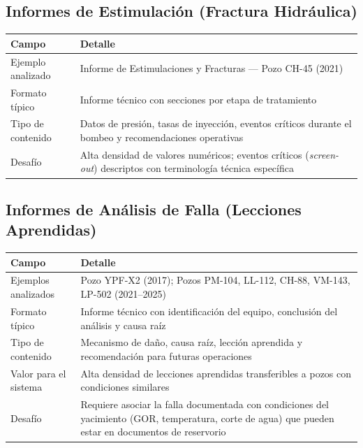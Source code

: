 \documentclass[12pt, a4paper]{article}
\begin{document}
\subsection{Informes de Estimulaci\'{o}n (Fractura Hidr\'{a}ulica)}

\begin{tabularx}{\textwidth}{BL}
  \toprule
  \textbf{Campo} & \textbf{Detalle} \\
  \midrule
  Ejemplo analizado   & Informe de Estimulaciones y Fracturas --- Pozo CH-45 (2021) \\
  \addlinespace
  Formato t\'{i}pico  & Informe t\'{e}cnico con secciones por etapa de tratamiento \\
  \addlinespace
  Tipo de contenido   & Datos de presi\'{o}n, tasas de inyecci\'{o}n, eventos cr\'{i}ticos
                        durante el bombeo y recomendaciones operativas \\
  \addlinespace
  Desaf\'{i}o         & Alta densidad de valores num\'{e}ricos; eventos cr\'{i}ticos
                        (\textit{screen-out}) descriptos con terminolog\'{i}a t\'{e}cnica
                        espec\'{i}fica \\
  \bottomrule
\end{tabularx}

\subsection{Informes de An\'{a}lisis de Falla (Lecciones Aprendidas)}

\begin{tabularx}{\textwidth}{BL}
  \toprule
  \textbf{Campo} & \textbf{Detalle} \\
  \midrule
  Ejemplos analizados & Pozo YPF-X2 (2017); Pozos PM-104, LL-112, CH-88, VM-143, LP-502
                        (2021--2025) \\
  \addlinespace
  Formato t\'{i}pico  & Informe t\'{e}cnico con identificaci\'{o}n del equipo,
                        conclusi\'{o}n del an\'{a}lisis y causa ra\'{i}z \\
  \addlinespace
  Tipo de contenido   & Mecanismo de da\~{n}o, causa ra\'{i}z, lecci\'{o}n aprendida y
                        recomendaci\'{o}n para futuras operaciones \\
  \addlinespace
  Valor para el sistema & Alta densidad de lecciones aprendidas transferibles a pozos con
                          condiciones similares \\
  \addlinespace
  Desaf\'{i}o         & Requiere asociar la falla documentada con condiciones del yacimiento
                        (GOR, temperatura, corte de agua) que pueden estar en documentos de
                        reservorio \\
  \bottomrule
\end{tabularx}
\end{document}

